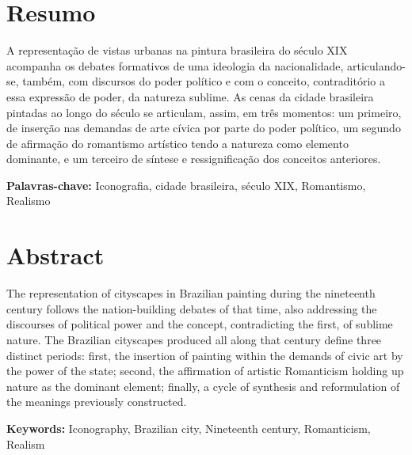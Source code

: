 \hypertarget{resumo}{%
\section{Resumo}\label{resumo}}

A representação de vistas urbanas na pintura brasileira do século XIX
acompanha os debates formativos de uma ideologia da nacionalidade,
articulando-se, também, com discursos do poder político e com o
conceito, contraditório a essa expressão de poder, da natureza sublime.
As cenas da cidade brasileira pintadas ao longo do século se articulam,
assim, em três momentos: um primeiro, de inserção nas demandas de arte
cívica por parte do poder político, um segundo de afirmação do
romantismo artístico tendo a natureza como elemento dominante, e um
terceiro de síntese e ressignificação dos conceitos anteriores.

\textbf{Palavras-chave:} Iconografia, cidade brasileira, século XIX,
Romantismo, Realismo

\hypertarget{abstract}{%
\section{Abstract}\label{abstract}}

The representation of cityscapes in Brazilian painting during the
nineteenth century follows the nation-building debates of that time,
also addressing the discourses of political power and the concept,
contradicting the first, of sublime nature. The Brazilian cityscapes
produced all along that century define three distinct periods: first,
the insertion of painting within the demands of civic art by the power
of the state; second, the affirmation of artistic Romanticism holding up
nature as the dominant element; finally, a cycle of synthesis and
reformulation of the meanings previously constructed.

\textbf{Keywords:} Iconography, Brazilian city, Nineteenth century,
Romanticism, Realism
